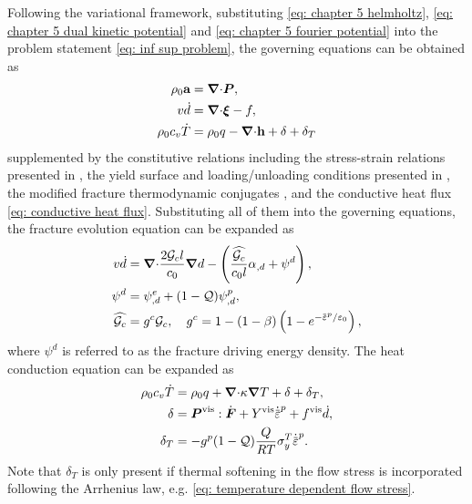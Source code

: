 Following the variational framework, substituting \eqref{eq: chapter 5 helmholtz}, \eqref{eq: chapter 5 dual kinetic potential} and \eqref{eq: chapter 5 fourier potential} into the problem statement \eqref{eq: inf sup problem}, the governing equations can be obtained as
\begin{align}
  \rho_0\textbf{a}       & ={\boldsymbol{\nabla} \cdot} \boldsymbol{P},                                \\
  v\dot{d}         & ={\boldsymbol{\nabla} \cdot} \boldsymbol{\xi} - f          ,              \\
  \rho_0c_v\dot{T} & = \rho_0 q - {\boldsymbol{\nabla} \cdot} \textbf{h} + \delta + \delta_T 
\end{align}
supplemented by the constitutive relations including the stress-strain relations presented in , the yield surface and loading/unloading conditions presented in , the modified fracture thermodynamic conjugates , and the conductive heat flux \eqref{eq: conductive heat flux}. Substituting all of them into the governing equations, the fracture evolution equation can be expanded as
\begin{align}
  v\dot{d}      & =\divergence \dfrac{2\Gc l}{c_0} \grad d - \left( \dfrac{\widehat{\Gc}}{c_0 l}\alpha_{,d} + \psi^d \right), \label{eq: modified fracture evolution} \\
  \psi^d        & = \psi^e_{,d} + (1-\tqf) \psi^p_{,d}, \label{eq: fracture driving energy}                                                                           \\
  \widehat{\Gc} & = g^c \Gc, \quad g^c = 1-(1-\beta)\left( 1-e^{-\ep/\varepsilon_0} \right),                                                                          
\end{align}
where $\psi^d$ is referred to as the fracture driving energy density. The heat conduction equation can be expanded as
\begin{align}
  \rho_0c_v\dot{T} & = \rho_0 q + \divergence \kappa \grad T + \delta + \delta_T,                 \\
  \delta           & = \bfP^\text{vis}:\dot{\defgrad} + Y^\text{vis}\epdot + f^\text{vis}\dot{d}, \\
  \delta_T         & = -g^p (1-\tqf) \dfrac{Q}{RT} \sigma_y^T\epdot.                              
\end{align}
Note that $\delta_T$ is only present if thermal softening in the flow stress is incorporated following the Arrhenius law, e.g. \eqref{eq: temperature dependent flow stress}.

